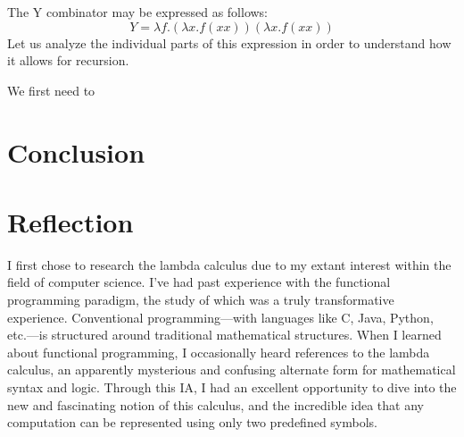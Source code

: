 \documentclass[twocolumn,titlepage,12pt]{article}
\begin{document}
The Y combinator may be expressed as follows:
$$Y=\lambda f.(\lambda x.f(x x))(\lambda x.f(x x))$$
Let us analyze the individual parts of this expression in order to understand how it allows for recursion.

We first need to

\section{Conclusion}


\section{Reflection}
I first chose to research the lambda calculus due to my extant interest within the field of computer science. I've had past experience with the functional programming paradigm, the study of which was a truly transformative experience. Conventional programming---with languages like C, Java, Python, etc.---is structured around traditional mathematical structures. When I learned about functional programming, I occasionally heard references to the lambda calculus, an apparently mysterious and confusing alternate form for mathematical syntax and logic.
Through this IA, I had an excellent opportunity to dive into the new and fascinating notion of this calculus, and the incredible idea that any computation can be represented using only two predefined symbols.


\end{document}
